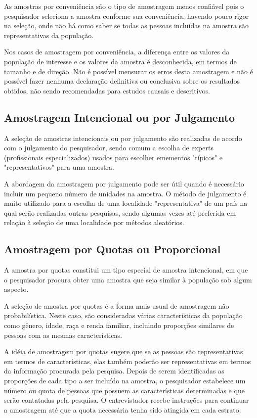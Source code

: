 As amostras por conveniência são o tipo de amostragem menos confiável pois o pesquisador seleciona a amostra conforme sua conveniência, havendo pouco rigor na seleção, onde não há como saber se todas as pessoas incluídas na amostra são representativas da população.\vskip0.3cm



Nos casos de amostragem por conveniência, a diferença entre os valores da população de interesse e os valores da amostra é desconhecida, em termos de tamanho e de direção. Não é possível mensurar os erros desta amostragem e não é possível fazer nenhuma declaração definitiva ou conclusiva sobre os resultados obtidos, não sendo recomendadas para estudos causais e descritivos.




\subsection{Amostragem Intencional ou por Julgamento}

A seleção de amostras intencionais ou por julgamento são realizadas de acordo com o julgamento do pesquisador, sendo comum a escolha de experts (profissionais especializados) usados para escolher emementos "típicos" e "representativos" para uma amostra.
\vskip0.3cm


A abordagem da amostragem por julgamento pode ser útil quando é necessário incluir um pequeno número de unidades na amostra. O método de julgamento é muito utilizado para a escolha de uma localidade "representativa" de um país na qual serão realizadas outras pesquisas, sendo algumas vezes até preferida em relação à seleção de uma localidade por métodos aleatórios.

\newpage 
\subsection{Amostragem por Quotas ou Proporcional}


A amostra por quotas constitui um tipo especial de amostra intencional, em que o pesquisador procura obter uma amostra que seja similar à população sob algum aspecto.\vskip0.3cm

A seleção de amostra por quotas é a forma mais usual de amostragem não probabilística. Neste caso, são consideradas várias características da população como gênero, idade, raça e renda familiar, incluindo proporções similares de pessoas com as mesmas características.\vskip0.3cm


A idéia de amostragem por quotas sugere que se as pessoas são representativas em termos de características, elas também poderão ser representativas em termos da informação procurada pela pesquisa. Depois de serem identificadas as proporções de cada tipo a ser incluído na amostra, o pesquisador estabelece um número ou quota de pessoas que possuem as características determinadas e que serão contatadas pela pesquisa. O entrevistador recebe instruções para continuar a amostragem até que a quota necessária tenha sido atingida em cada estrato.\vskip0.3cm


